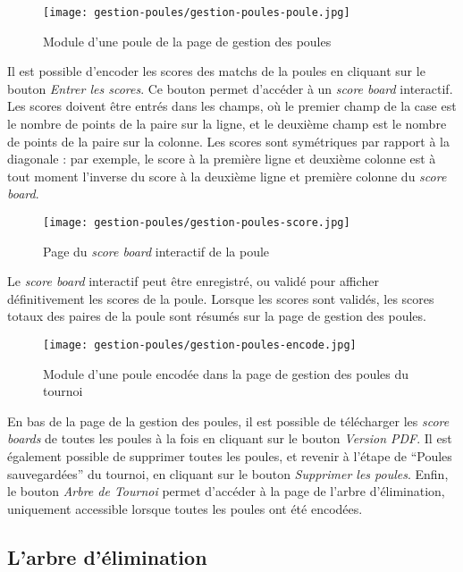 \begin{figure}[H]
\centering
\texttt{[image: gestion-poules/gestion-poules-poule.jpg]}
\caption{Module d'une poule de la page de gestion des poules}
\end{figure}

Il est possible d'encoder les scores des matchs de la poules en cliquant sur le bouton \textit{Entrer les scores}. Ce bouton permet d'accéder à un \textit{score board} interactif. Les scores doivent être entrés dans les champs, où le premier champ de la case est le nombre de points de la paire sur la ligne, et le deuxième champ est le nombre de points de la paire sur la colonne. Les scores sont symétriques par rapport à la diagonale : par exemple, le score à la première ligne et deuxième colonne est à tout moment l'inverse du score à la deuxième ligne et première colonne du \textit{score board}.

\begin{figure}[H]
\centering
\texttt{[image: gestion-poules/gestion-poules-score.jpg]}
\caption{Page du \textit{score board} interactif de la poule}
\end{figure}

Le \textit{score board} interactif peut être enregistré, ou validé pour afficher définitivement les scores de la poule. Lorsque les scores sont validés, les scores totaux des paires de la poule sont résumés sur la page de gestion des poules.

\begin{figure}[H]
\centering
\texttt{[image: gestion-poules/gestion-poules-encode.jpg]}
\caption{Module d'une poule encodée dans la page de gestion des poules du tournoi}
\end{figure}

En bas de la page de la gestion des poules, il est possible de télécharger les \textit{score boards} de toutes les poules à la fois en cliquant sur le bouton \textit{Version PDF}. Il est également possible de supprimer toutes les poules, et revenir à l'étape de \enquote{Poules sauvegardées} du tournoi, en cliquant sur le bouton \textit{Supprimer les poules}. Enfin, le bouton \textit{Arbre de Tournoi} permet d'accéder à la page de l'arbre d'élimination, uniquement accessible lorsque toutes les poules ont été encodées.

\subsection{L'arbre d'élimination}

